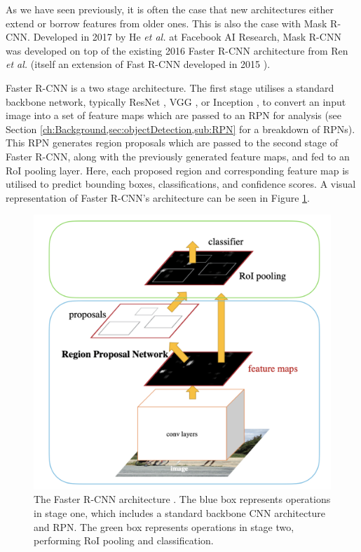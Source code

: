 As we have seen previously, it is often the case that new architectures either extend or borrow features from older ones. This is also the case with Mask R-CNN. Developed in 2017 by He \textit{et al.} at Facebook AI Research, Mask R-CNN was developed on top of the existing 2016 Faster R-CNN architecture from Ren \textit{et al.} \cite{ren_faster_2015} (itself an extension of Fast R-CNN developed in 2015 \cite{girshick_fast_2015}). 

Faster R-CNN is a two stage architecture. The first stage utilises a standard backbone network, typically ResNet \cite{he_deep_2015}, VGG \cite{simonyan_very_2015}, or Inception \cite{szegedy_going_2015}, to convert an input image into a set of feature maps which are passed to an RPN for analysis (see Section \ref{ch:Background,sec:objectDetection,sub:RPN} for a breakdown of RPNs). This RPN generates region proposals which are passed to the second stage of Faster R-CNN, along with the previously generated feature maps, and fed to an RoI pooling layer.  Here, each proposed region and corresponding feature map is utilised to predict bounding boxes, classifications, and confidence scores. A visual representation of Faster R-CNN's architecture can be seen in Figure \ref{fig:faster-r-cnn-architecture}.


\begin{figure}
	\begin{center}
		\includegraphics[scale=0.3]{Chapter2/figs/faster-r-cnn-architecture.png}
	\end{center}
	\caption{The Faster R-CNN architecture \cite{ren_faster_2015}. The blue box represents operations in stage one, which includes a standard backbone CNN architecture and RPN. The green box represents operations in stage two, performing RoI pooling and classification.}
	\label{fig:faster-r-cnn-architecture}
\end{figure}

